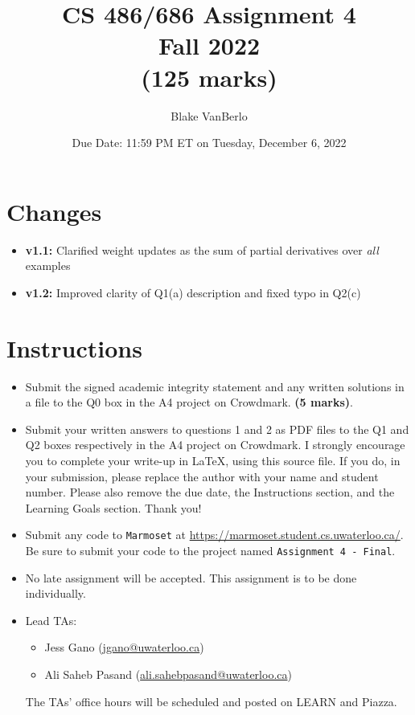 \documentclass[12pt]{article}
\title{CS 486/686 Assignment 4 \\ Fall 2022 \\ (125 marks)}
\author{Blake VanBerlo}
\date{Due Date: 11:59 PM ET on Tuesday, December 6, 2022}
\begin{document}
\maketitle

\section*{Changes}

\begin{itemize}
\item
{\bf v1.1:} Clarified weight updates as the sum of partial derivatives over {\it all} examples
\item
{\bf v1.2:} Improved clarity of Q1(a) description and fixed typo in Q2(c)
\end{itemize}

\newpage
\section*{Instructions}

\begin{itemize}
\item
Submit the signed academic integrity statement and any written solutions in a file to the Q0 box in the A4 project on Crowdmark. \textbf{(5 marks)}.

\item Submit your written answers to questions 1 and 2 as PDF files to the Q1 and Q2 boxes respectively in the A4 project on Crowdmark. I strongly encourage you to complete your write-up in LaTeX, using this source file. If you do, in your submission, please replace the author with your name and student number. Please also remove the due date, the Instructions section, and the Learning Goals section. Thank you!

\item Submit any code to \verb+Marmoset+ at \url{https://marmoset.student.cs.uwaterloo.ca/}. Be sure to submit your code to the project named \texttt{Assignment 4 - Final}. 

\item
No late assignment will be accepted. This assignment is to be done individually.

\item
Lead TAs: 
\begin{itemize}
\item 
Jess Gano (\url{jgano@uwaterloo.ca})
\item
Ali Saheb Pasand (\url{ali.sahebpasand@uwaterloo.ca})
\end{itemize}
The TAs' office hours will be scheduled and posted on LEARN and Piazza.
\end{itemize}
\end{document}
